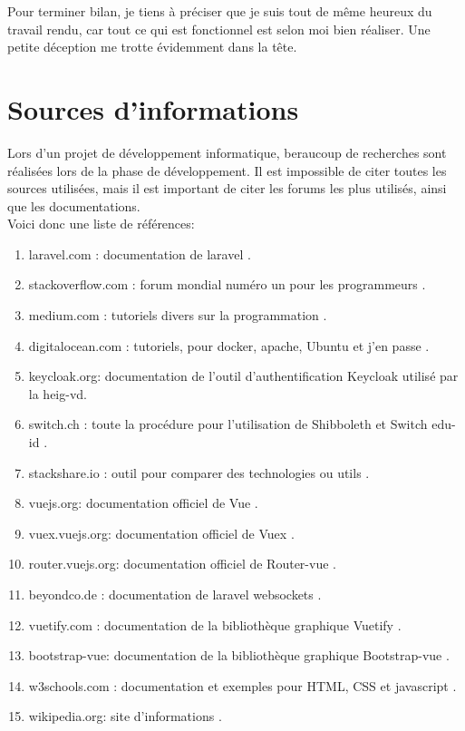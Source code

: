 \documentclass[
    iai, %
    il, %
]{heig-tb}
\begin{document}
Pour terminer bilan, je tiens à préciser que je suis tout de même heureux du travail rendu, car tout ce qui est fonctionnel est selon moi bien réaliser. Une petite déception me trotte évidemment dans la tête.

\section{Sources d'informations}
Lors d'un projet de développement informatique, beraucoup de recherches sont réalisées lors de la
phase de développement. Il est impossible de citer toutes les sources utilisées, mais il est
important de citer les forums les plus utilisés, ainsi que les documentations.\\
Voici donc une liste de références:

\begin{enumerate}
    \item laravel.com : documentation de \Gls{laravel} \cite{laravel}.
    \item stackoverflow.com : forum mondial numéro un pour les programmeurs \cite{stackoverflow}.
    \item medium.com : tutoriels divers sur la programmation \cite{medium}.
    \item digitalocean.com : tutoriels, pour \Gls{docker}, \Gls{apache}, Ubuntu et j'en passe \cite{digitalocean}.
    \item keycloak.org: documentation de l'outil d'authentification Keycloak utilisé par la \Gls{heig-vd}.
    \item switch.ch : toute la procédure pour l’utilisation de Shibboleth et Switch edu-id \cite{switch}.
    \item stackshare.io : outil pour comparer des technologies ou utils \cite{stackshare}.
    \item vuejs.org: documentation officiel de Vue \cite{vuejs}.
    \item vuex.vuejs.org: documentation officiel de Vuex \cite{vuex}.
    \item router.vuejs.org: documentation officiel de Router-vue \cite{vue-router}.
    \item beyondco.de : documentation de \Gls{laravel} \Gls{websockets} \cite{beyondco}.
    \item vuetify.com : documentation de la bibliothèque graphique Vuetify \cite{vuetify}.
    \item bootstrap-vue: documentation de la bibliothèque graphique Bootstrap-vue \cite{bootstrap-vue}.
    \item w3schools.com : documentation et exemples pour HTML, CSS et \Gls{javascript} \cite{w3schools}.
    \item wikipedia.org: site d'informations \cite{wikipedia}.
\end{enumerate}
\end{document}
